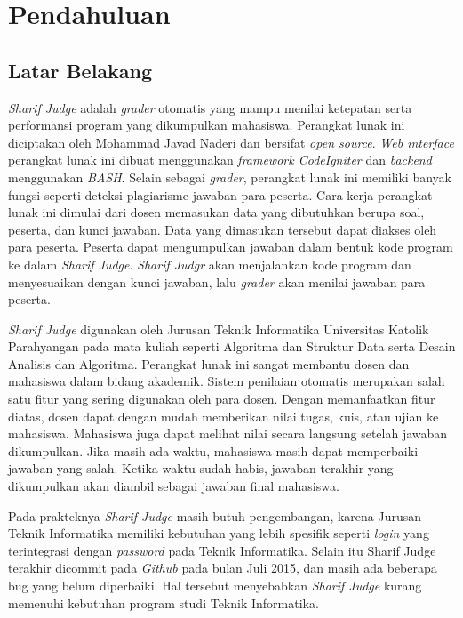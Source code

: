\chapter{Pendahuluan}
\label{chap:intro}
   
\section{Latar Belakang}
\label{sec:label}
\textit{Sharif Judge} adalah \textit{grader} otomatis yang mampu menilai ketepatan serta performansi program yang dikumpulkan mahasiswa. Perangkat lunak ini diciptakan oleh Mohammad Javad Naderi dan bersifat \textit{open source}. \textit{Web interface} perangkat lunak ini dibuat menggunakan \textit{framework CodeIgniter} dan \textit{backend} menggunakan \textit{BASH}. Selain sebagai \textit{grader}, perangkat lunak ini memiliki banyak fungsi seperti deteksi plagiarisme jawaban para peserta. Cara kerja perangkat lunak ini dimulai dari dosen memasukan data yang dibutuhkan berupa soal, peserta, dan kunci jawaban. Data yang dimasukan tersebut dapat diakses oleh para peserta. Peserta dapat mengumpulkan jawaban dalam bentuk kode program ke dalam \textit{Sharif Judge}. \textit{Sharif Judgr} akan menjalankan kode program dan menyesuaikan dengan kunci jawaban, lalu \textit{grader} akan menilai jawaban para peserta.

\textit{Sharif Judge} digunakan oleh Jurusan Teknik Informatika Universitas Katolik Parahyangan pada mata kuliah seperti Algoritma dan Struktur Data serta Desain Analisis dan Algoritma. Perangkat lunak ini sangat membantu dosen dan mahasiswa dalam bidang akademik. Sistem penilaian otomatis merupakan salah satu fitur yang sering digunakan oleh para dosen. Dengan memanfaatkan fitur diatas, dosen dapat dengan mudah memberikan nilai tugas, kuis, atau ujian ke mahasiswa. Mahasiswa juga dapat melihat nilai secara langsung setelah jawaban dikumpulkan. Jika masih ada waktu, mahasiswa masih dapat memperbaiki jawaban yang salah. Ketika waktu sudah habis, jawaban terakhir yang dikumpulkan akan diambil sebagai jawaban final mahasiswa.

Pada prakteknya \textit{Sharif Judge} masih butuh pengembangan, karena Jurusan Teknik Informatika memiliki kebutuhan yang lebih spesifik seperti \textit{login} yang terintegrasi dengan \textit{password} pada Teknik Informatika. Selain itu Sharif Judge terakhir dicommit pada \textit{Github} pada bulan Juli 2015, dan masih ada beberapa bug yang belum diperbaiki. Hal tersebut menyebabkan \textit{Sharif Judge} kurang memenuhi kebutuhan program studi Teknik Informatika. 

